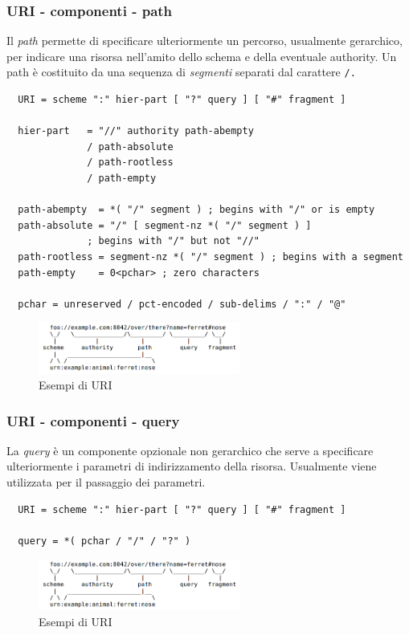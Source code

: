 \documentclass[8pt]{beamer}
\begin{document}
\begin{frame}[fragile]
	\frametitle{URI - componenti - path}
	
	Il \emph{path} permette di specificare ulteriormente un percorso,
	usualmente gerarchico, per indicare una risorsa nell'amito dello
	schema e della eventuale authority. Un path \`e costituito da una
	sequenza di  \emph{segmenti} separati dal carattere \tt{/}.
	
	\begin{verbatim}
  URI = scheme ":" hier-part [ "?" query ] [ "#" fragment ]

  hier-part   = "//" authority path-abempty
              / path-absolute
              / path-rootless
              / path-empty                  

  path-abempty  = *( "/" segment ) ; begins with "/" or is empty
  path-absolute = "/" [ segment-nz *( "/" segment ) ] 
              ; begins with "/" but not "//"
  path-rootless = segment-nz *( "/" segment ) ; begins with a segment
  path-empty    = 0<pchar> ; zero characters  

  pchar = unreserved / pct-encoded / sub-delims / ":" / "@"  
	\end{verbatim}
	
	\begin{figure}
	    \includegraphics[width=250px]{imgs/uri-pieces.png}
	    \caption{Esempi di URI}
	\end{figure}
	
\end{frame}

\begin{frame}[fragile]
	\frametitle{URI - componenti - query}
	
	La \emph{query} \`e un componente opzionale non gerarchico che serve
	a specificare ulteriormente i parametri di indirizzamento della
	risorsa. Usualmente viene utilizzata per il passaggio dei parametri.
	
	\begin{verbatim}
  URI = scheme ":" hier-part [ "?" query ] [ "#" fragment ]

  query = *( pchar / "/" / "?" )
	\end{verbatim}
	
	\vspace{\baselineskip}
	
	\begin{figure}
	    \includegraphics[width=250px]{imgs/uri-pieces.png}
	    \caption{Esempi di URI}
	\end{figure}
	
\end{frame}
\end{document}
